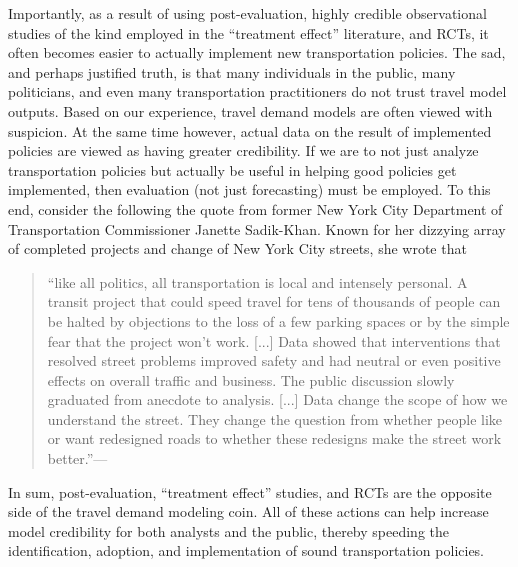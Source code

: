 Importantly, as a result of using post-evaluation, highly credible observational studies of the kind employed in the ``treatment effect'' literature, and RCTs, it often becomes easier to actually implement new transportation policies. The sad, and perhaps justified truth, is that many individuals in the public, many politicians, and even many transportation practitioners do not trust travel model outputs. Based on our experience, travel demand models are often viewed with suspicion. At the same time however, actual data on the result of implemented policies are viewed as having greater credibility. If we are to not just analyze transportation policies but actually be useful in helping good policies get implemented, then evaluation (not just forecasting) must be employed. To this end, consider the following the quote from former New York City Department of Transportation Commissioner Janette Sadik-Khan. Known for her dizzying array of completed projects and change of New York City streets, she wrote that
\begin{quotation}
``like all politics, all transportation is local and intensely personal. A transit project that could speed travel for tens of thousands of people can be halted by objections to the loss of a few parking spaces or by the simple fear that the project won't work. [...] Data showed that interventions that resolved street problems improved safety and had neutral or even positive effects on overall traffic and business. The public discussion slowly graduated from anecdote to analysis. [...] Data change the scope of how we understand the street. They change the question from whether people like or want redesigned roads to whether these redesigns make the street work better.''---\citep{sadik2016streetfight}
\end{quotation}

In sum, post-evaluation, ``treatment effect'' studies, and RCTs are the opposite side of the travel demand modeling coin. All of these actions can help increase model credibility for both analysts and the public, thereby speeding the identification, adoption, and implementation of sound transportation policies.

